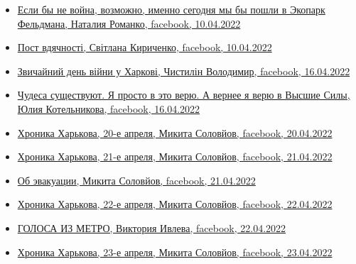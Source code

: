 \begin{itemize}
\item \hyperlink{10_04_2022.fb.romanko_natalia.harkov.kobeljaki.numerolog.1.ekopark_feldmana}{%
Если бы не война, возможно, именно сегодня мы бы пошли в Экопарк Фельдмана, %
Наталия Романко, facebook, 10.04.2022%
}

\item \hyperlink{10_04_2022.fb.kirychenko_svitlana.harkiv.1.post_vdjachnosti}{%
Пост вдячності, Світлана Кириченко, facebook, 10.04.2022%
}

\item \hyperlink{16_04_2022.fb.chystilin_volodymyr.harkov.1.den_vijny}{%
Звичайний день війни у Харкові, Чистилін Володимир, facebook, 16.04.2022%
}

\item \hyperlink{16_04_2022.fb.kotelnikova_julia.harkov.psiholog.1.chudesa}{%
Чудеса существуют. Я просто в это верю. А вернее я верю в Высшие Силы, Юлия Котельникова, facebook, %
16.04.2022%
}


\item \hyperlink{20_04_2022.fb.solovjov_mikita.harkov.demsokyra.1.hronika}{%
Хроника Харькова, 20-е апреля, Микита Соловйов, facebook, 20.04.2022%
}

\item \hyperlink{21_04_2022.fb.solovjov_mikita.harkov.demsokyra.1.hronika}{%
Хроника Харькова, 21-е апреля, Микита Соловйов, facebook, 21.04.2022%
}

\item \hyperlink{21_04_2022.fb.solovjov_mikita.harkov.demsokyra.2.evakuacia}{%
Об эвакуации, Микита Соловйов, facebook, 21.04.2022%
}

\item \hyperlink{22_04_2022.fb.solovjov_mikita.harkov.demsokyra.1.hronika}{%
Хроника Харькова, 22-е апреля, Микита Соловйов, facebook, 22.04.2022%
}

\item \hyperlink{22_04_2022.fb.ivleva_viktoria.moskva.ng.1.golosa_iz_metro}{%
ГОЛОСА ИЗ МЕТРО, Виктория Ивлева, facebook, 22.04.2022%
}

\item \hyperlink{23_04_2022.fb.solovjov_mikita.harkov.demsokyra.1.hronika}{%
Хроника Харькова, 23-е апреля, Микита Соловйов, facebook, 23.04.2022%
}

\end{itemize} %

